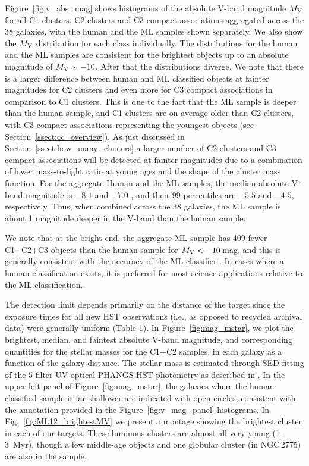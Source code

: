 \documentclass[linenumbers]{aastex63}
\begin{document}
Figure~\ref{fig:v_abs_mag} shows histograms of the absolute V-band magnitude $M_{\rm V}$ for all C1 clusters, C2 clusters and C3 compact associations aggregated across the 38 galaxies, with the human and the ML samples shown separately. {We also show the $M_{\rm V}$ distribution for each class individually.} The distributions for the human and the ML samples are consistent for the brightest objects up to an absolute magnitude of $M_{\rm V} \sim -10$. After that the distributions diverge.
{We note that there is a larger difference between human and ML classified objects at fainter magnitudes for C2 clusters and even more for C3 compact associations in comparison to C1 clusters. 
This is due to the fact that the ML sample is deeper than the human sample, and C1 clusters are on average older than C2 clusters, with C3 compact associations representing the youngest objects (see Section~\ref{ssect:cc_overview}). As just discussed in Section~\ref{ssect:how_many_clusters} a larger number of C2 clusters and C3 compact associations will be detected at fainter magnitudes due to a combination of lower mass-to-light ratio at young ages and the shape of the cluster mass function.}
For the aggregate Human and the ML samples, the median absolute V-band magnitude is $-8.1$ and $-7.0$ , and their 99-percentiles are $-5.5$ and $-4.5$, respectively. Thus, when combined across the 38 galaxies, the ML sample is about 1 magnitude deeper in the V-band than the human sample.


We note that at the bright end, the aggregate ML sample has 409 fewer C1+C2+C3 objects than the human sample for $M_{\rm V} < -10$\,mag, and this is generally consistent with the accuracy of the ML classifier \citep{hannon_star_2023}.  In cases where a human classification exists, it is preferred for most science applications relative to the ML classification.



The detection limit depends primarily on the distance of the target since the exposure times for all new HST observations (i.e., as opposed to recycled archival data) were generally uniform (Table 1).  In Figure~\ref{fig:mag_mstar}, we plot the brightest, median, and faintest absolute V-band magnitude, and corresponding quantities for the stellar masses for the C1+C2 samples, in each galaxy as a function of the galaxy distance. The stellar mass is estimated through SED fitting of the 5 filter UV-optical PHANGS-HST photometry as described in \citet{thilker23sed}.
In the upper left panel of Figure~\ref{fig:mag_mstar}, the galaxies where the human classified sample is far shallower are indicated with open circles, consistent with the annotation provided in the Figure~\ref{fig:v_mag_panel} histograms. In Fig.~\ref{fig:ML12_brightestMV} we present a montage showing the brightest cluster in each of our targets.  These luminous clusters are almost all very young (1--3~Myr), though a few middle-age objects and one globular cluster (in NGC\,2775) are also in the sample.
\end{document}
